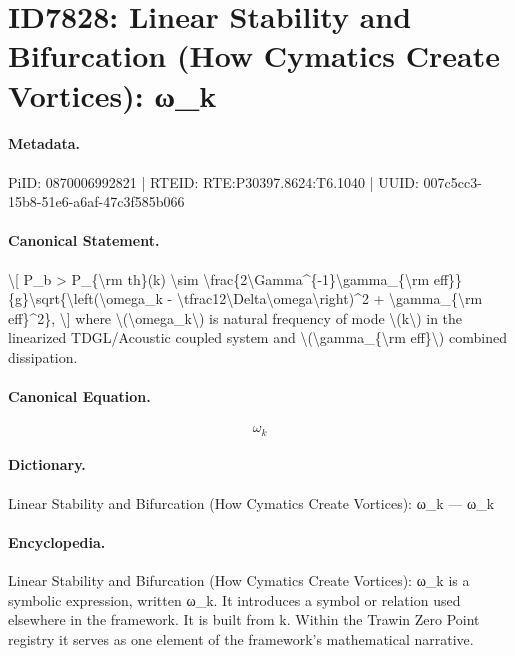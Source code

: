 \section*{ID7828: Linear Stability and Bifurcation (How Cymatics Create Vortices): ω\_k}
\paragraph{Metadata.}
PiID: 0870006992821 | RTEID: RTE:P30397.8624:T6.1040 | UUID: 007c5cc3-15b8-51e6-a6af-47c3f585b066

\paragraph{Canonical Statement.}
\textbackslash{}[ P\_b > P\_\{\textbackslash{}rm th\}(k) \textbackslash{}sim \textbackslash{}frac\{2\textbackslash{}Gamma\textasciicircum{}\{-1\}\textbackslash{}gamma\_\{\textbackslash{}rm eff\}\}\{g\}\textbackslash{}sqrt\{\textbackslash{}left(\textbackslash{}omega\_k - \textbackslash{}tfrac12\textbackslash{}Delta\textbackslash{}omega\textbackslash{}right)\textasciicircum{}2 + \textbackslash{}gamma\_\{\textbackslash{}rm eff\}\textasciicircum{}2\}, \textbackslash{}] where \textbackslash{}(\textbackslash{}omega\_k\textbackslash{}) is natural frequency of mode \textbackslash{}(k\textbackslash{}) in the linearized TDGL/Acoustic coupled system and \textbackslash{}(\textbackslash{}gamma\_\{\textbackslash{}rm eff\}\textbackslash{}) combined dissipation.

\paragraph{Canonical Equation.}
\[
\omega_k
\]

\paragraph{Dictionary.}
Linear Stability and Bifurcation (How Cymatics Create Vortices): ω\_k — ω\_k

\paragraph{Encyclopedia.}
Linear Stability and Bifurcation (How Cymatics Create Vortices): ω\_k is a symbolic expression, written ω\_k. It introduces a symbol or relation used elsewhere in the framework. It is built from k. Within the Trawin Zero Point registry it serves as one element of the framework's mathematical narrative.
